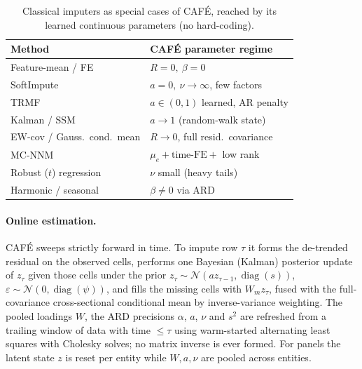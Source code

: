 \documentclass[10pt,twocolumn]{article}
\newcommand{\cafe}{CAF\'E}
\begin{document}
\begin{table}[t]\centering\small
\setlength{\tabcolsep}{3pt}
\caption{Classical imputers as special cases of \cafe{}, reached by its learned
continuous parameters (no hard-coding).}
\label{tab:special}
\begin{tabular}{@{}ll@{}}
\toprule
Method & \cafe{} parameter regime \\
\midrule
Feature-mean / FE & $R{=}0,\ \beta{=}0$ \\
SoftImpute~\cite{mazumder2010} & $a{=}0,\ \nu{\to}\infty$, few factors \\
TRMF~\cite{yu2016} & $a\in(0,1)$ learned, AR penalty \\
Kalman / SSM~\cite{harvey1989} & $a{\to}1$ (random-walk state) \\
EW-cov / Gauss.\ cond.\ mean & $R{\to}0$, full resid.\ covariance \\
MC-NNM~\cite{athey2021} & $\mu_e+\text{time-FE}+$ low rank \\
Robust ($t$) regression & $\nu$ small (heavy tails) \\
Harmonic / seasonal & $\beta\neq0$ via ARD \\
\bottomrule
\end{tabular}
\end{table}

\paragraph{Online estimation.} \cafe{} sweeps strictly forward in time. To
impute row $\tau$ it forms the de-trended residual on the observed cells,
performs one Bayesian (Kalman) posterior update of $z_\tau$ given those cells
under the prior $z_\tau\sim\mathcal N(a z_{\tau-1},\operatorname{diag}(s))$,
$\varepsilon\sim\mathcal N(0,\operatorname{diag}(\psi))$, and fills the missing
cells with $W_{\!m} z_\tau$, fused with the full-covariance cross-sectional
conditional mean by inverse-variance weighting. The pooled loadings $W$, the ARD
precisions $\alpha$, $a$, $\nu$ and $s^2$ are refreshed from a trailing window of
data with time $\le\tau$ using warm-started alternating least squares with
Cholesky solves; no matrix inverse is ever formed. For panels the latent state
$z$ is reset per entity while $W,a,\nu$ are pooled across entities.
\end{document}
